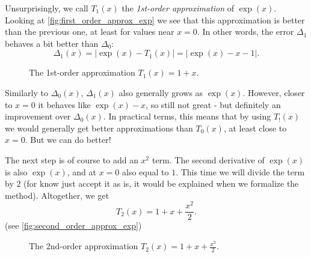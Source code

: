 Unsurprisingly, we call $T_{1}(x)$ the \emph{1st-order approximation} of $\exp(x)$. Looking at \autoref{fig:first_order_approx_exp} we see that this approximation is better than the previous one, at least for values near $x=0$. In other words, the error $\Delta_{1}$ behaves a bit better than $\Delta_{0}$:
\begin{equation}
  \Delta_{1}(x) = \left| \exp(x) - T_{1}(x) \right| = \left| \exp(x)-x-1 \right|.
  \label{eq:exp_err_1}
\end{equation}

\begin{figure}
  \centering
  \caption{The 1st-order approximation $T_{1}(x)=1+x$.}
  \label{fig:first_order_approx_exp}
\end{figure}

Similarly to $\Delta_{0}(x)$, $\Delta_{1}(x)$ also generally grows as $\exp(x)$. However, closer to $x=0$ it behaves like $\exp(x)-x$, so still not great - but definitely an improvement over $\Delta_{0}(x)$. In practical terms, this means that by using $T_{!}(x)$ we would generally get better approximations than $T_{0}(x)$, at least close to $x=0$. But we can do better!

The next step is of course to add an $x^{2}$ term. The second derivative of $\exp(x)$ is also $\exp(x)$, and at $x=0$ also equal to $1$. This time we will divide the term by $2$ (for know just accept it as is, it would be explained when we formalize the method). Altogether, we get
\begin{equation}
  T_{2}(x) = 1 + x + \frac{x^{2}}{2}.
  \label{eq:second_order_approx_exp}
\end{equation}
(see \autoref{fig:second_order_approx_exp})

\begin{figure}
  \centering
  \caption{The 2nd-order approximation $T_{2}(x)=1+x+\frac{x^{2}}{2}$.}
  \label{fig:second_order_approx_exp}
\end{figure}

